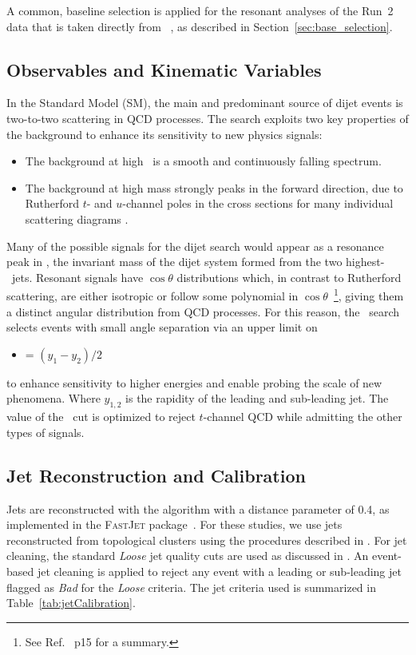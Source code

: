 A common, baseline selection is applied for the resonant  analyses of
the Run~2 data that is taken directly from ~\cite{Nishu:2646455}, as
described in Section~\ref{sec:base_selection}. 


\subsection{Observables and Kinematic Variables}
\label{sec:observables}
In the Standard Model (SM), the main and predominant source of dijet
events is two-to-two scattering in QCD processes. The search exploits
two key properties of the background to enhance its sensitivity to new
physics signals:

\begin{itemize}
	\item The background at high \mjj\ is a smooth and continuously falling spectrum.
	\item The background at high mass strongly peaks in the forward
direction, due to Rutherford $t$- and $u$-channel poles in the cross sections
for many individual scattering diagrams \cite{Harris:2011bh}.
\end{itemize}

Many of the possible signals for the dijet search would appear as a
resonance peak in \mjj, the invariant mass of the dijet system formed
from the two highest-\pT\ jets. Resonant signals have $\cos{\theta}$
distributions which, in contrast to Rutherford scattering, are either
isotropic or follow some polynomial in $\cos{\theta}$~\footnote{See
Ref.~\cite{Harris:2011bh} p15 for a summary.}, giving them a distinct
angular distribution from QCD processes. For this reason, the \mjj\
search selects events with small angle separation via an upper limit on
\begin{itemize}
	\item \ystar = $(y_1-y_2)/2$
\end{itemize}
to enhance sensitivity to higher energies and enable probing the scale
of new phenomena. Where $y_{1,2}$ is the rapidity of the leading and
sub-leading jet. The value of the \ystar\ cut is optimized to reject
$t$-channel QCD while admitting the other types of signals.

\subsection{Jet Reconstruction and Calibration}
Jets are reconstructed with the \akt algorithm \cite{Cacciari:2008gp}
with a distance parameter of 0.4, as implemented in the \textsc{FastJet}
package~\cite{Cacciari:2011ma}. For these studies, we use jets
reconstructed from topological clusters using the procedures described
in \cite{ATLAS-CONF-2015-002}. For jet cleaning, the standard
\textit{Loose} jet quality cuts are used as discussed in
\cite{ATLAS-CONF-2015-029}. An event-based jet cleaning is applied to
reject any event with a leading or sub-leading jet flagged as
\textit{Bad} for the \textit{Loose} criteria.  The jet criteria used is
summarized in Table~\ref{tab:jetCalibration}.

